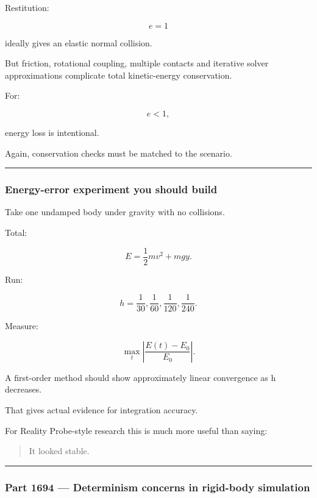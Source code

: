 Restitution:

\[
e=1
\]

ideally gives an elastic normal collision.

But friction, rotational coupling, multiple contacts and iterative solver approximations complicate total kinetic-energy conservation.

For:

\[
e<1,
\]

energy loss is intentional.

Again, conservation checks must be matched to the scenario.

\begin{center}\rule{0.5\linewidth}{0.5pt}\end{center}

\subsubsection{Energy-error experiment you should build}\label{energy-error-experiment-you-should-build}

Take one undamped body under gravity with no collisions.

Total:

\[
E
=
\frac12mv^2+
mgy.
\]

Run:

\[
h=\frac1{30},
\frac1{60},
\frac1{120},
\frac1{240}.
\]

Measure:

\[
\max_t
\left|
\frac{E(t)-E_0}{E_0}
\right|.
\]

A first-order method should show approximately linear convergence as h decreases.

That gives actual evidence for integration accuracy.

For Reality Probe-style research this is much more useful than saying:

\begin{quote}
It looked stable.
\end{quote}

\begin{center}\rule{0.5\linewidth}{0.5pt}\end{center}

\subsubsection{Part 1694 --- Determinism concerns in rigid-body simulation}\label{part-1694-determinism-concerns-in-rigid-body-simulation}

